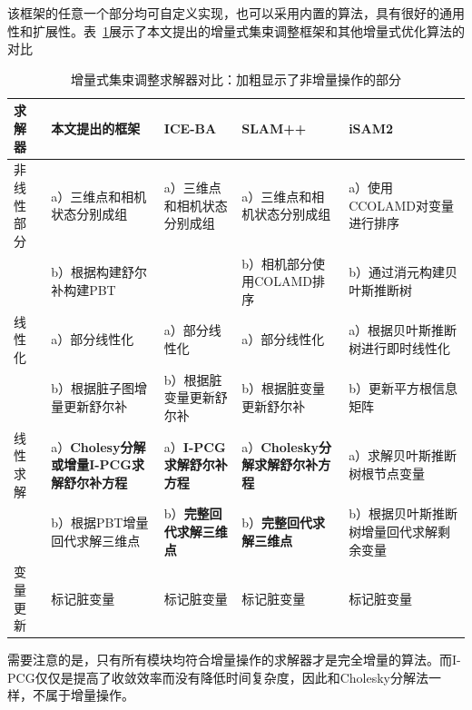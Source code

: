 该框架的任意一个部分均可自定义实现，也可以采用内置的算法，具有很好的通用性和扩展性。表~\ref{tab:comp}展示了本文提出的增量式集束调整框架和其他增量式优化算法的对比

{
\linespread{1}
\begin{table}[H]
\caption{增量式集束调整求解器对比：加粗显示了非增量操作的部分}
\label{tab:comp}
\centering
\begin{tabular}{l|p{} p{} p{} p{}}
    \toprule
    求解器     & 本文提出的框架
               & ICE-BA
               & SLAM++
               & iSAM2
               \\ \midrule
    非线性部分 & a）三维点和相机状态分别成组
               & a）三维点和相机状态分别成组
               & a）三维点和相机状态分别成组
               & a）使用CCOLAMD对变量进行排序
               \\
               & b）根据构建舒尔补构建PBT
               &
               & b）相机部分使用COLAMD排序
               & b）通过消元构建贝叶斯推断树
               \\ \midrule
    线性化     & a）部分线性化
               & a）部分线性化
               & a）部分线性化
               & a）根据贝叶斯推断树进行即时线性化
               \\
               & b）根据脏子图增量更新舒尔补
               & b）根据脏变量更新舒尔补
               & b）根据脏变量更新舒尔补
               & b）更新平方根信息矩阵
               \\ \midrule
    线性求解   & a）\textbf{Cholesy分解或增量I-PCG求解舒尔补方程}
               & a）\textbf{I-PCG求解舒尔补方程}
               & a）\textbf{Cholesky分解求解舒尔补方程}
               & a）求解贝叶斯推断树根节点变量
               \\
               & b）根据PBT增量回代求解三维点
               & b）\textbf{完整回代求解三维点}
               & b）\textbf{完整回代求解三维点}
               & b）根据贝叶斯推断树增量回代求解剩余变量
               \\ \midrule
    变量更新   & 标记脏变量
               & 标记脏变量
               & 标记脏变量
               & 标记脏变量
               \\
    \bottomrule
\end{tabular}
\end{table}
}

需要注意的是，只有所有模块均符合增量操作的求解器才是完全增量的算法。而I-PCG仅仅是提高了收敛效率而没有降低时间复杂度，因此和Cholesky分解法一样，不属于增量操作。

